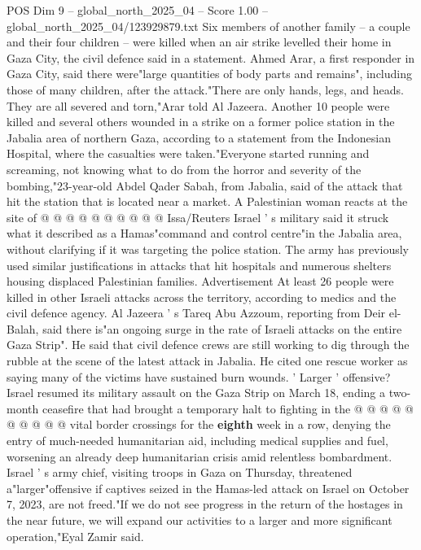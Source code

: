 \begin{textsample}{POS Dim 9 – global\_north\_2025\_04 – Score 1.00 – global\_north\_2025\_04/123929879.txt}  \label{ex:f9_pos_430}
Six members of another family -- a couple and their four children -- were killed when an air strike levelled their home in Gaza City, the civil defence said in a statement.
Ahmed Arar, a first responder in Gaza City, said there were"large quantities of body parts and remains", including those of many children, after the attack."There are only hands, legs, and heads.
They are all severed and torn,"Arar told Al Jazeera.
Another 10 people were killed and several others wounded in a strike on a former police station in the Jabalia area of northern Gaza, according to a statement from the Indonesian Hospital, where the casualties were taken."Everyone started running and screaming, not knowing what to do from the horror and severity of the bombing,"23-year-old Abdel Qader Sabah, from Jabalia, said of the attack that hit the station that is located near a market.
A Palestinian woman reacts at the site of @ @ @ @ @ @ @ @ @ @ Issa/Reuters Israel ' s military said it struck what it described as a Hamas"command and control centre"in the Jabalia area, without clarifying if it was targeting the police station.
The army has previously used similar justifications in attacks that hit hospitals and numerous shelters housing displaced Palestinian families.
Advertisement At least 26 people were killed in other Israeli attacks across the territory, according to medics and the civil defence agency.
Al Jazeera ' s Tareq Abu Azzoum, reporting from Deir el-Balah, said there is"an ongoing surge in the rate of Israeli attacks on the entire Gaza Strip".
He said that civil defence crews are still working to dig through the rubble at the scene of the latest attack in Jabalia.
He cited one rescue worker as saying many of the victims have sustained burn wounds. ' Larger ' offensive?
Israel resumed its military assault on the Gaza Strip on March 18, ending a two-month ceasefire that had brought a temporary halt to fighting in the @ @ @ @ @ @ @ @ @ @ vital border crossings for the \textbf{eighth} week in a row, denying the entry of much-needed humanitarian aid, including medical supplies and fuel, worsening an already deep humanitarian crisis amid relentless bombardment.
Israel ' s army chief, visiting troops in Gaza on Thursday, threatened a"larger"offensive if captives seized in the Hamas-led attack on Israel on October 7, 2023, are not freed."If we do not see progress in the return of the hostages in the near future, we will expand our activities to a larger and more significant operation,"Eyal Zamir said.

\end{textsample}
